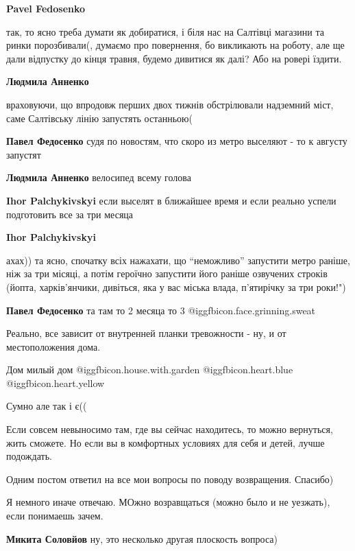 \begin{itemize}
\begin{itemize}
\textbf{Pavel Fedosenko} 

так, то ясно треба думати як добиратися, і біля нас на Салтівці магазини та
ринки порозбивали(, думаємо про повернення, бо викликають на роботу, але ще
дали відпустку до кінця травня, будемо дивитися як далі? Або на ровері їздити.

\textbf{Людмила Анненко} 

враховуючи, що впродовж перших двох тижнів обстрілювали надземний міст, саме
Салтівську лінію запустять останньою(

\textbf{Павел Федосенко} судя по новостям, что скоро из метро выселяют - то к августу запустят

\textbf{Людмила Анненко} велосипед всему голова

\textbf{Ihor Palchykivskyi} если выселят в ближайшее время и если реально успели подготовить все за три месяца

\textbf{Ihor Palchykivskyi} 

ахах)) та ясно, спочатку всіх нажахати, що \enquote{неможливо} запустити метро раніше,
ніж за три місяці, а потім героїчно запустити його раніше озвучених строків
(йопта, харків'янчики, дивіться, яка у вас міська влада, п'ятирічку за три
роки!")

\textbf{Павел Федосенко} та там то 2 месяца то 3  @igg{fbicon.face.grinning.sweat} 

Реально, все зависит от внутренней планки тревожности - ну, и от местоположения дома.
\end{itemize} %

Дом милый дом  @igg{fbicon.house.with.garden}  @igg{fbicon.heart.blue}  @igg{fbicon.heart.yellow} 

Сумно але так і є((


Если совсем невыносимо там, где вы сейчас находитесь, то можно вернуться, жить
сможете. Но если вы в комфортных условиях для себя и детей, лучше подождать.

Одним постом ответил на все мои вопросы по поводу возвращения. Спасибо)

Я немного иначе отвечаю. МОжно возравщаться (можно было и не уезжать), если понимаешь зачем.

\begin{itemize} %
\textbf{Микита Соловйов} ну, это несколько другая плоскость вопроса)
\end{itemize} %


\end{itemize}
